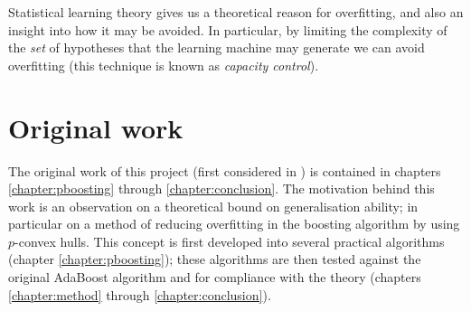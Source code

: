 Statistical learning theory gives us a theoretical reason for
overfitting, and also an insight into how it may be avoided.  In
particular, by limiting the complexity of the \emph{set} of hypotheses
that the learning machine may generate we can avoid overfitting (this
technique is known as \emph{capacity control}).


\section{Original work}

The original work of this project (first considered in
\cite{Williamson99}) is contained in chapters \ref{chapter:pboosting}
through \ref{chapter:conclusion}.  The motivation behind this work is
an observation on a theoretical bound on generalisation ability; in
particular on a method of reducing overfitting in the boosting
algorithm by using $p$-convex hulls.  This concept is first developed
into several practical algorithms (chapter \ref{chapter:pboosting});
these algorithms are then tested against the original AdaBoost
algorithm and for compliance with the theory (chapters
\ref{chapter:method} through \ref{chapter:conclusion}). 





